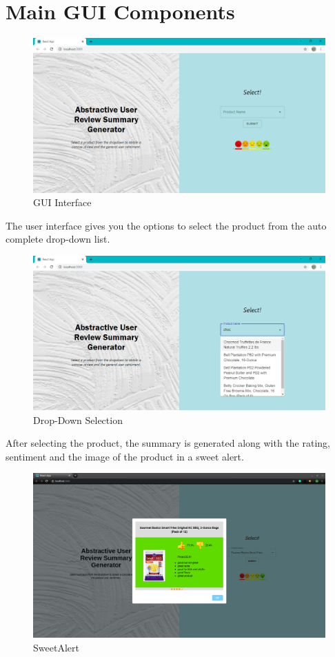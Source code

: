 \documentclass[11pt]{report}
\begin{document}
\section{Main GUI Components}
\begin{figure}[H]
\centering
\includegraphics[scale=0.45]{images/homepage.png}
\caption{GUI Interface}
\label{fig:homepage}
\end{figure}
The user interface gives you the options to select the product from the auto complete drop-down list.\\

\begin{figure}[H]
\centering
\includegraphics[scale=0.42]{images/dropdown.png}
\caption{Drop-Down Selection}
\label{fig:dropdown}
\end{figure}
After selecting the product, the summary is generated along with the rating, sentiment and the image of the product in a sweet alert. 

\begin{figure}[hbt!]
\centering
\includegraphics[scale=0.23]{images/FinalOutput.png}
\caption{SweetAlert}
\label{fig:output}
\end{figure}
\end{document}
